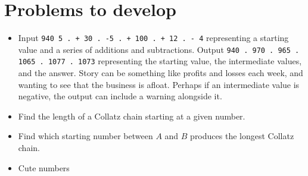 \section*{Problems to develop}
\begin{itemize}
  \item Input \texttt{940 5 . + 30 . -5 . + 100 . + 12 . - 4} representing a starting
    value and a series of additions and subtractions. Output \texttt{940 . 970 . 965 .
    1065 . 1077 . 1073} representing the starting value, the intermediate values, and the
    answer. Story can be something like profits and losses each week, and wanting to see
    that the business is afloat. Perhaps if an intermediate value is negative, the output
    can include a warning alongside it.
  \item Find the length of a Collatz chain starting at a given number.
  \item Find which starting number between $A$ and $B$ produces the longest Collatz chain.
  \item Cute numbers
\end{itemize}
